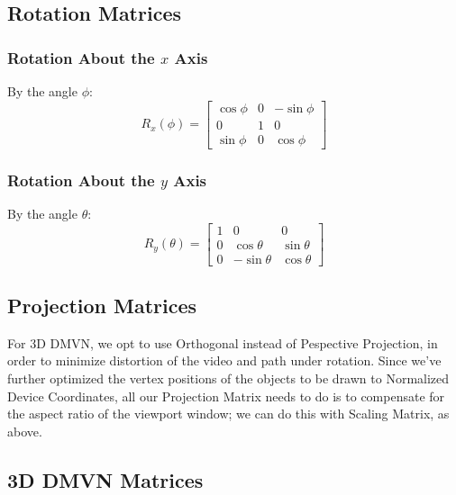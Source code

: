 \subsection{Rotation Matrices}
\label{rotmat}

\subsubsection{Rotation About the $x$ Axis}
By the angle $\phi$:
\begin{equation}
R_x(\phi) =
\begin{bmatrix}
    \cos\phi & 0 & -\sin\phi \\
    0 & 1 & 0 \\
    \sin\phi & 0 & \cos\phi
\end{bmatrix}
\end{equation}

\subsubsection{Rotation About the $y$ Axis}
By the angle $\theta$:
\begin{equation}
R_y(\theta) =
\begin{bmatrix}
    1 & 0 & 0 \\
    0 & \cos\theta & \sin\theta \\
    0 & -\sin\theta & \cos\theta
\end{bmatrix}
\end{equation}

\subsection{Projection Matrices}
For 3D DMVN, we opt to use Orthogonal instead of Pespective Projection, in order to minimize distortion of the video and path under rotation. Since we've further optimized the vertex positions of the objects to be drawn to Normalized Device Coordinates, all our Projection Matrix needs to do is to compensate for the aspect ratio of the viewport window; we can do this with Scaling Matrix, as above.

\subsection{3D DMVN Matrices}
